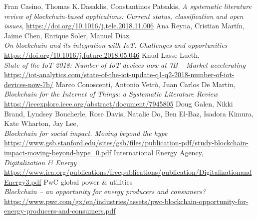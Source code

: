\documentclass[11pt]{article}
\begin{document}
\begin{thebibliography}{22}

	Fran Casino, Thomas K.\,Dasaklis, Constantinos Patsakis,
	\textit{A systematic literature review of blockchain-based applications: Current status, classification and open issues},
	\hyperref[https://doi.org/10.1016/j.tele.2018.11.006]{https://doi.org/10.1016/j.tele.2018.11.006}
	Ana Reyna, Cristian Martín, Jaime Chen, Enrique Soler, Manuel Díaz,\\
	\textit{On blockchain and its integration with IoT. Challenges and opportunities}\\
	\hyperref[https://doi.org/10.1016/j.future.2018.05.046]{https://doi.org/10.1016/j.future.2018.05.046}
	Knud Lasse Lueth,\\
	\textit{State of the IoT 2018: Number of IoT devices now at 7B – Market accelerating}\\
	\hyperref[https://iot-analytics.com/state-of-the-iot-update-q1-q2-2018-number-of-iot-devices-now-7b/]{https://iot-analytics.com/state-of-the-iot-update-q1-q2-2018-number-of-iot-devices-now-7b/}
	Marco Conoscenti, Antonio Vetrò, Juan Carlos De Martin,\\
	\textit{Blockchain for the Internet of Things: a Systematic Literature Review}\\
	\hyperref[https://ieeexplore.ieee.org/abstract/document/7945805]{https://ieeexplore.ieee.org/abstract/document/7945805}
	Doug Galen, Nikki Brand, Lyndsey Boucherle, Rose Davis, Natalie Do, Ben El-Baz, Isadora Kimura, Kate Wharton, Jay Lee,\\
	\textit{Blockchain for social impact. Moving beyond the hype}\\
	\hyperref[https://www.gsb.stanford.edu/sites/gsb/files/publication-pdf/study-blockchain-impact-moving-beyond-hype_0.pdf]{https://www.gsb.stanford.edu/sites/gsb/files/publication-pdf/study-blockchain-impact-moving-beyond-hype\_0.pdf}
	International Energy Agency,\\
	\textit{Digitalization \& Energy}\\
	\hyperref[https://www.iea.org/publications/freepublications/publication/DigitalizationandEnergy3.pdf]{https://www.iea.org/publications/freepublications/publication/DigitalizationandEnergy3.pdf}
	PwC global power \& utilities\\
	\textit{Blockchain – an opportunity for energy producers and consumers?}\\
	\hyperref[https://www.pwc.com/gx/en/industries/assets/pwc-blockchain-opportunity-for-energy-producers-and-consumers.pdf]{https://www.pwc.com/gx/en/industries/assets/pwc-blockchain-opportunity-for-energy-producers-and-consumers.pdf}

\end{thebibliography}
\end{document}
